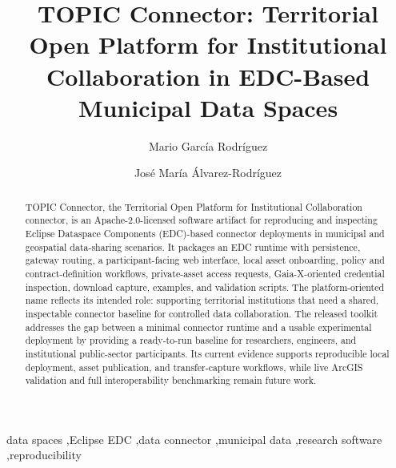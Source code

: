 \documentclass[a4paper,fleqn]{cas-dc}
\begin{document}
\let\WriteBookmarks\relax
\def\floatpagepagefraction{1}
\def\textpagefraction{.001}


\title[mode=title]{TOPIC Connector: Territorial Open Platform for Institutional Collaboration in EDC-Based Municipal Data Spaces}

\author[1]{Mario García Rodríguez}
\cormark[1]

\author[1]{José María Álvarez-Rodríguez}




\begin{abstract}
TOPIC Connector, the Territorial Open Platform for Institutional Collaboration connector, is an Apache-2.0-licensed software artifact for reproducing and inspecting Eclipse Dataspace Components (EDC)-based connector deployments in municipal and geospatial data-sharing scenarios. It packages an EDC runtime with persistence, gateway routing, a participant-facing web interface, local asset onboarding, policy and contract-definition workflows, private-asset access requests, Gaia-X-oriented credential inspection, download capture, examples, and validation scripts. The platform-oriented name reflects its intended role: supporting territorial institutions that need a shared, inspectable connector baseline for controlled data collaboration. The released toolkit addresses the gap between a minimal connector runtime and a usable experimental deployment by providing a ready-to-run baseline for researchers, engineers, and institutional public-sector participants. Its current evidence supports reproducible local deployment, asset publication, and transfer-capture workflows, while live ArcGIS validation and full interoperability benchmarking remain future work.
\end{abstract}


\begin{keywords}
data spaces \sep Eclipse EDC \sep data connector \sep municipal data \sep research software \sep reproducibility
\end{keywords}
\end{document}
